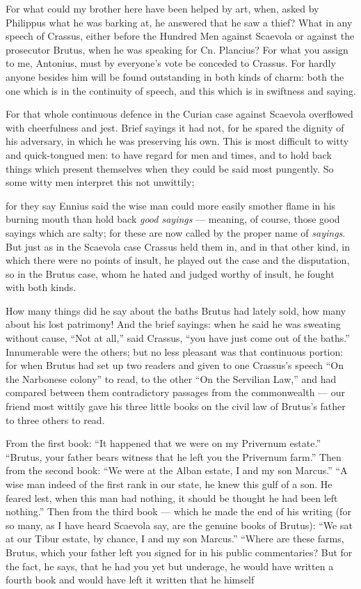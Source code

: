  For what could my brother here have been helped by art, when, asked by Philippus what he was barking at, he answered that he saw a thief? What in any speech of Crassus, either before the Hundred Men against Scaevola or against the prosecutor Brutus, when he was speaking for Cn. Plancius? For what you assign to me, Antonius, must by everyone's vote be conceded to Crassus. For hardly anyone besides him will be found outstanding in both kinds of charm: both the one which is in the continuity of speech, and this which is in swiftness and saying.

 For that whole continuous defence in the Curian case against Scaevola overflowed with cheerfulness and jest. Brief sayings it had not, for he spared the dignity of his adversary, in which he was preserving his own. This is most difficult to witty and quick-tongued men: to have regard for men and times, and to hold back things which present themselves when they could be said most pungently. So some witty men interpret this not unwittily;

 for they say Ennius said the wise man could more easily smother flame in his burning mouth than hold back \textit{good sayings} — meaning, of course, those good sayings which are salty; for these are now called by the proper name of \textit{sayings}. But just as in the Scaevola case Crassus held them in, and in that other kind, in which there were no points of insult, he played out the case and the disputation, so in the Brutus case, whom he hated and judged worthy of insult, he fought with both kinds.

 How many things did he say about the baths Brutus had lately sold, how many about his lost patrimony! And the brief sayings: when he said he was sweating without cause, ``Not at all,'' said Crassus, ``you have just come out of the baths.'' Innumerable were the others; but no less pleasant was that continuous portion: for when Brutus had set up two readers and given to one Crassus's speech ``On the Narbonese colony'' to read, to the other ``On the Servilian Law,'' and had compared between them contradictory passages from the commonwealth — our friend most wittily gave his three little books on the civil law of Brutus's father to three others to read.

 From the first book: ``It happened that we were on my Privernum estate.'' ``Brutus, your father bears witness that he left you the Privernum farm.'' Then from the second book: ``We were at the Alban estate, I and my son Marcus.'' ``A wise man indeed of the first rank in our state, he knew this gulf of a son. He feared lest, when this man had nothing, it should be thought he had been left nothing.'' Then from the third book — which he made the end of his writing (for so many, as I have heard Scaevola say, are the genuine books of Brutus): ``We sat at our Tibur estate, by chance, I and my son Marcus.'' ``Where are these farms, Brutus, which your father left you signed for in his public commentaries? But for the fact, he says, that he had you yet but underage, he would have written a fourth book and would have left it written that he himself

